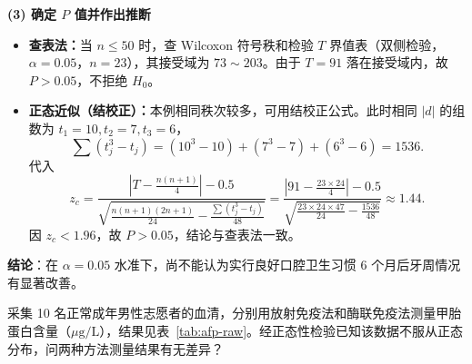 \documentclass[lang=cn,10pt]{elegantbook}
\begin{document}
\begin{solution}
\textbf{(3) 确定 $P$ 值并作出推断}
\begin{itemize}
    \item \textbf{查表法：}当 $n\le 50$ 时，查 Wilcoxon 符号秩和检验 $T$ 界值表（双侧检验，$\alpha=0.05$，$n=23$），其接受域为 $73\sim 203$。由于 $T=91$ 落在接受域内，故 $P>0.05$，不拒绝 $H_0$。
    \item \textbf{正态近似（结校正）：}本例相同秩次较多，可用结校正公式。此时相同 $|d|$ 的组数为 $t_1=10,t_2=7,t_3=6$，
    \[
    \sum\left(t_j^3-t_j\right)=(10^3-10)+(7^3-7)+(6^3-6)=1536.
    \]
    代入
    \[
    z_c = \frac{\left|T-\frac{n(n+1)}{4}\right|-0.5}{\sqrt{\frac{n(n+1)(2n+1)}{24}-\frac{\sum\left(t_j^3-t_j\right)}{48}}}
    =\frac{\left|91-\frac{23\times 24}{4}\right|-0.5}{\sqrt{\frac{23\times 24\times 47}{24}-\frac{1536}{48}}}\approx 1.44.
    \]
    因 $z_c<1.96$，故 $P>0.05$，结论与查表法一致。
\end{itemize}

\textbf{结论}：在 $\alpha=0.05$ 水准下，尚不能认为实行良好口腔卫生习惯 6 个月后牙周情况有显著改善。
\end{solution}

\vspace{0.2cm}
\begin{exercise}
采集 10 名正常成年男性志愿者的血清，分别用放射免疫法和酶联免疫法测量甲胎蛋白含量（$\mu\mathrm{g}/\mathrm{L}$），结果见表~\ref{tab:afp-raw}。经正态性检验已知该数据不服从正态分布，问两种方法测量结果有无差异？
\end{exercise}
\end{document}
